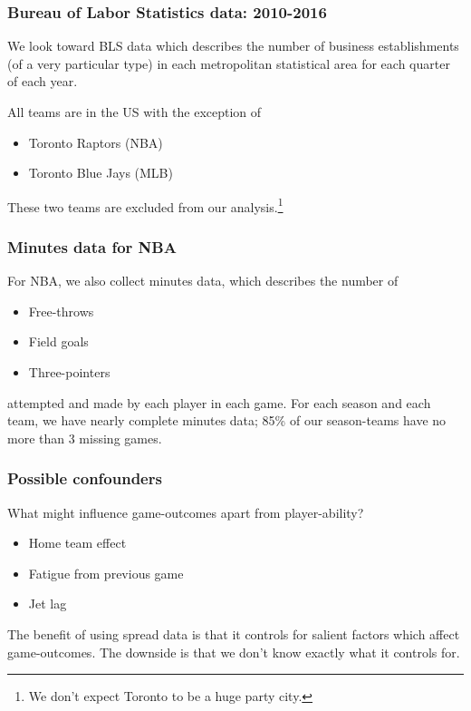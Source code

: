 \documentclass{beamer}
\begin{document}
\begin{frame}   \frametitle{Bureau of Labor Statistics data: 2010-2016}
  We look toward BLS data which describes the number of business establishments 
  (of a very particular type) in each metropolitan statistical area
  for each quarter of each year.
  
  \vspace{12pt}  All teams are in the US with the exception of 
  \vspace{12pt}\begin{itemize}     \item Toronto Raptors (NBA)
    \item Toronto Blue Jays (MLB)   \end{itemize} 

  \vspace{12pt}These two teams are excluded from our analysis.\footnote{We don't expect Toronto to be a huge party city.} \end{frame}

\begin{frame}   \frametitle{Minutes data for NBA}
  For NBA, we also collect minutes data, which describes the number of 
  \vspace{12pt}
  \begin{itemize}     
    \item Free-throws
    \item Field goals
    \item Three-pointers   
  \end{itemize}
  \vspace{12pt}attempted and made by each player in each game. For each season and each team,
  we have nearly complete minutes data; 85\% of our season-teams have no more than 3 missing games. \end{frame}


\begin{frame}
  \frametitle{Possible confounders}
  What might influence game-outcomes apart from player-ability?

  \vspace{12pt}\begin{itemize}     
    \item Home team effect
    \item Fatigue from previous game
    \item Jet lag   
    \end{itemize}

  \vspace{12pt}The benefit of using spread data is that it controls for salient factors which affect game-outcomes.
  The downside is that we don't know exactly what it controls for. \end{frame}
\end{document}
